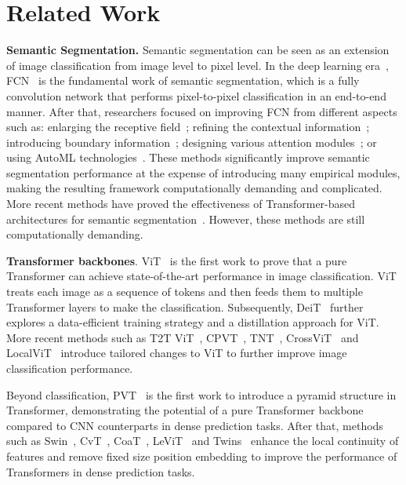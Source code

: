 \section{Related Work}

\textbf{Semantic Segmentation.}
Semantic segmentation can be seen as an extension of image classification from image level to pixel level. In the deep learning era~\cite{resnet,krizhevsky2012imagenet,simonyan2014very,Li_2019_CVPR,wang2018_mix}, FCN~\cite{fcn} is the fundamental work of semantic segmentation, which is a fully convolution network that performs pixel-to-pixel classification in an end-to-end manner. After that, researchers focused on improving FCN from different aspects such as:  enlarging the receptive field~\cite{pspnet, denseaspp,largekernel,dilate,deeplab,deeplabv2,deeplabv3+}; refining the contextual information~\cite{ocnet,cpn,ocrnet,encnet,zhou2019context,refinenet,contextnet,cgnet,apcnet}; introducing boundary information~\cite{ding2019boundary,bertasius2016semantic,li2020improving,segfix,zhen2020joint,gatescnn,dfn,chen2016semantic}; designing various attention modules~\cite{danet,nonlocal,sanet,ccnet,pan,psanet,emanet,gcnet,trans2seg}; or using AutoML technologies~\cite{squeezenas,fasterseg,dynamicrouting,autodeeplab,nekrasov2019fast}.
These methods significantly improve semantic segmentation performance at the expense of introducing many empirical modules, making the resulting framework computationally demanding and complicated. More recent methods have proved the effectiveness of Transformer-based architectures for semantic segmentation~\cite{setr,trans2seg}. However, these methods are still computationally demanding.


\textbf{Transformer backbones}. ViT~\cite{vit} is the first work to prove that a pure Transformer can achieve state-of-the-art performance in image classification. ViT treats each image as a sequence of tokens and then feeds them to multiple Transformer layers to make the classification.  Subsequently, DeiT~\cite{DETR} further explores a data-efficient training strategy and a distillation approach for ViT. More recent methods such as T2T ViT~\cite{yuan2021tokens}, CPVT~\cite{chu2021conditional}, TNT~\cite{han2021Transformer}, CrossViT~\cite{chen2021crossvit} and LocalViT~\cite{li2021localvit} introduce tailored changes to ViT to further improve image classification performance.

Beyond classification, PVT~\cite{pvt} is the first work to introduce a pyramid structure in Transformer, demonstrating the potential of a pure Transformer backbone compared to CNN counterparts in dense prediction tasks. After that, methods such as Swin~\cite{liu2021swin}, CvT~\cite{wu2021cvt}, CoaT~\cite{xu2021co}, LeViT~\cite{graham2021levit} and Twins~\cite{chu2021twins} enhance the local continuity of features and remove fixed size position embedding to improve the performance of Transformers in dense prediction tasks.


